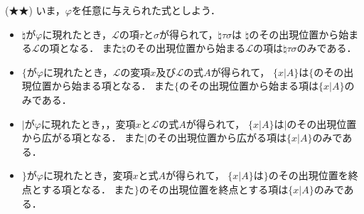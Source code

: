 \documentclass[a4j,10.5pt,oneside,openany]{jsbook}
\theoremstyle{mystyle}
\begin{document}
	\begin{screen}
		(★★) いま，$\varphi$を任意に与えられた式としよう．
		\begin{itemize}
			\item $\natural$が$\varphi$に現れたとき，$\mathcal{L}$の項$\tau$と$\sigma$が得られて，$\natural \tau \sigma$は
				$\natural$のその出現位置から始まる$\mathcal{L}$の項となる．
				また$\natural$のその出現位置から始まる$\mathcal{L}$の項は$\natural \tau \sigma$のみである．
				
			\item $\{$が$\varphi$に現れたとき，$\mathcal{L}$の変項$x$及び$\mathcal{L}$の式$A$が得られて，
				$\{ x|A\}$は$\{$のその出現位置から始まる項となる．
				また$\{$のその出現位置から始まる項は$\{x|A\}$のみである．
				
			\item $|$が$\varphi$に現れたとき，，変項$x$と$\mathcal{L}$の式$A$が得られて，
				$\{x|A\}$は$|$のその出現位置から広がる項となる．
				また$|$のその出現位置から広がる項は$\{x|A\}$のみである．
				
			\item $\}$が$\varphi$に現れたとき，変項$x$と式$A$が得られて，
				$\{x|A\}$は$\}$のその出現位置を終点とする項となる．
				また$\}$のその出現位置を終点とする項は$\{x|A\}$のみである．
		\end{itemize}
	\end{screen}
	
\end{document}
